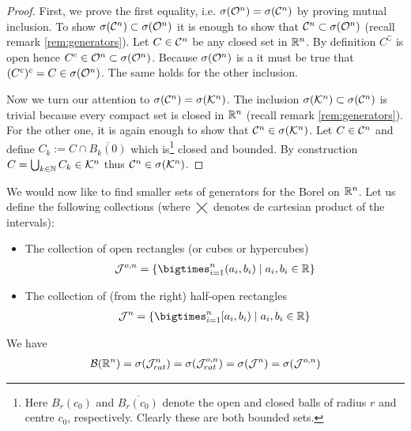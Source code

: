 \begin{proof}
	First, we prove the first equality, i.e. $\sigma(\mathcal{O}^n) = \sigma(\mathcal{C}^n)$ by proving mutual inclusion. To show $\sigma(\mathcal{C}^n) \subset \sigma(\mathcal{O}^n)$ it is enough to show that $\mathcal{C}^n \subset \sigma(\mathcal{O}^n)$ (recall remark \ref{rem:generators}). Let $C \in \mathcal{C}^n$ be any closed set in $\mathbb{R}^n$. By definition $C^\complement$ is open hence $C^c \in \mathcal{O}^n \subset \sigma(\mathcal{O}^n)$. Because $\sigma(\mathcal{O}^n)$ is a \siga it must be true that $(C^c)^c = C \in \sigma(\mathcal{O}^n)$. The same holds for the other inclusion.
	
	Now we turn our attention to $\sigma(\mathcal{C}^n) = \sigma(\mathcal{K}^n)$. The inclusion $\sigma(\mathcal{K}^n) \subset \sigma (\mathcal{C}^n)$ is trivial because every compact set is closed in $\mathbb{R}^n$ (recall remark \ref{rem:generators}). For the other one, it is again enough to show that $\mathcal{C}^n \in \sigma(\mathcal{K}^n)$. Let $C \in \mathcal{C}^n$ and define $C_k := C \cap \overline{B_k(0)}$ which is\footnote{Here $B_r(c_0)$ and $\overline{B_r(c_0)}$ denote the open and closed balls of radius $r$ and centre $c_0$, respectively. Clearly these are both bounded sets.} closed and bounded. By construction $C = \bigcup_{k \in \mathbb{N}} C_k \in \mathcal{K}^n$ thus $\mathcal{C}^n \in \sigma(\mathcal{K}^n)$.
\end{proof}

We would now like to find smaller sets of generators for the Borel \siga on $\mathbb{R}^n$. Let us define the following collections (where $\bigtimes$ denotes de cartesian product of the intervals):


\begin{itemize}
	\item The collection of open rectangles (or cubes or hypercubes)
	\begin{align*}
		\calJ^{o,n} = \{\bigtimes_{i = 1}^n (a_i, b_i) \mid a_i, b_i \in \R\}
	\end{align*}
	\item The collection of (from the right) half-open rectangles
	\begin{align*}
		\calJ^{n} = \{\bigtimes_{i = 1}^n [a_i, b_i) \mid a_i, b_i \in \R\}
	\end{align*}
\end{itemize}

\begin{thm}
	\label{thm:borel-interval-generators}
	We have
	\begin{align*}
		\mathcal{B}(\mathbb{R}^n) = \sigma(\mathcal{J}_{rat}^n) = \sigma(\mathcal{J}_{rat}^{o,n}) = \sigma(\mathcal{J}^n) = \sigma(\mathcal{J}^{o,n})
	\end{align*}
\end{thm}

